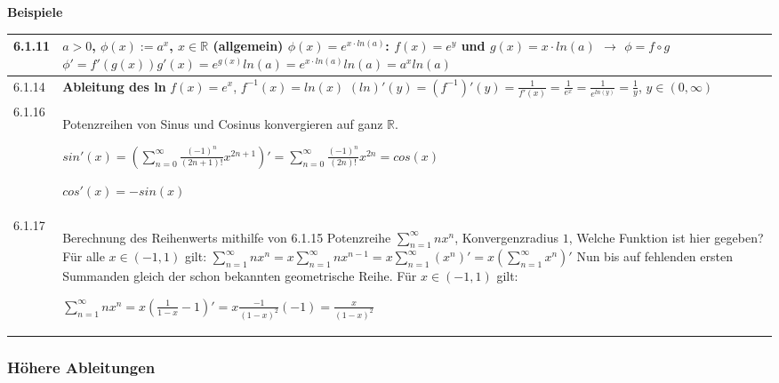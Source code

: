     \noindent
    \textbf{Beispiele}
    \begin{table}[H]
    \begin{tabularx}{\textwidth}{X m{16cm}}
        \toprule

        6.1.11& $a > 0$, $\phi(x):= a^x$, $x \in \mathbb{R}$ (allgemein) \hfill \break
                $\phi(x) = e^{x\cdot ln(a)}$: $f(x) = e^y$ und $g(x) = x\cdot ln(a)$ $\rightarrow$ $\phi = f\circ g$ \hfill \break
                $\phi' = f'(g(x))g'(x) = e^{g(x)}ln(a) = e^{x\cdot ln(a)}ln(a) = a^xln(a)$ \\
        \midrule
        6.1.14& \textbf{Ableitung des ln} \hfill \break
                $f(x) = e^x$, $f^{-1}(x) = ln(x)$ \hfill \break
                $(ln)'(y) = (f^{-1})'(y) = \frac{1}{f'(x)} = \frac{1}{e^x} = \frac{1}{e^{ln(y)}} = \frac{1}{y}$, $y \in (0, \infty)$ \\
        \midrule
        6.1.16& Potenzreihen von Sinus und Cosinus konvergieren auf ganz $\mathbb{R}$. \hfill \break
                \centerline{$ sin'(x) = (\sum^{\infty}_{n=0} \frac{(-1)^n}{(2n+1)!} x^{2n+1})' = 
                \sum^{\infty}_{n=0} \frac{(-1)^n}{(2n)!}x^{2n} = cos(x)$}
                \centerline{$cos'(x) = -sin(x)$} \\
        \midrule
        6.1.17& Berechnung des Reihenwerts mithilfe von 6.1.15 \hfill \break
                Potenzreihe $\sum^{\infty}_{n=1} nx^n$, Konvergenzradius $1$, Welche Funktion ist hier gegeben? \hfill \break
                Für alle $x\in (-1,1)$ gilt: $\sum^{\infty}_{n=1} nx^n = x \sum^{\infty}_{n=1} nx^{n-1} =
                x \sum^{\infty}_{n=1} (x^n)' = x(\sum^{\infty}_{n=1} x^n)'$ \hfill \break
                Nun bis auf fehlenden ersten Summanden gleich der schon bekannten geometrische Reihe. Für $x \in (-1,1)$ gilt: \hfill \break
                \centerline{$ \sum^{\infty}_{n=1} nx^n = x( \frac{1}{1-x} - 1)' = x \frac{-1}{(1-x)^2}(-1) = \frac{x}{(1-x)^2} $} \\
        
        \bottomrule
    \end{tabularx}
    \end{table}

\subsubsection{Höhere Ableitungen}

